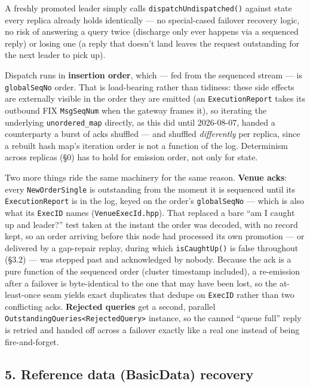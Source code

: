 \documentclass[
  10pt,
]{article}
\begin{document}
A freshly promoted leader simply calls \texttt{dispatchUndispatched()}
against state every replica already holds identically --- no
special-cased failover recovery logic, no risk of answering a query
twice (discharge only ever happens via a sequenced reply) or losing one
(a reply that doesn't land leaves the request outstanding for the next
leader to pick up).

Dispatch runs in \textbf{insertion order}, which --- fed from the
sequenced stream --- is \texttt{globalSeqNo} order. That is load-bearing
rather than tidiness: these side effects are externally visible in the
order they are emitted (an \texttt{ExecutionReport} takes its outbound
FIX \texttt{MsgSeqNum} when the gateway frames it), so iterating the
underlying \texttt{unordered\_map} directly, as this did until
2026-08-07, handed a counterparty a burst of acks shuffled --- and
shuffled \emph{differently} per replica, since a rebuilt hash map's
iteration order is not a function of the log. Determinism across
replicas (§0) has to hold for emission order, not only for state.

Two more things ride the same machinery for the same reason.
\textbf{Venue acks}: every \texttt{NewOrderSingle} is outstanding from
the moment it is sequenced until its \texttt{ExecutionReport} is in the
log, keyed on the order's \texttt{globalSeqNo} --- which is also what
its \texttt{ExecID} names (\texttt{VenueExecId.hpp}). That replaced a
bare ``am I caught up and leader?'' test taken at the instant the order
was decoded, with no record kept, so an order arriving before this node
had processed its own promotion --- or delivered by a gap-repair replay,
during which \texttt{isCaughtUp()} is false throughout (§3.2) --- was
stepped past and acknowledged by nobody. Because the ack is a pure
function of the sequenced order (cluster timestamp included), a
re-emission after a failover is byte-identical to the one that may have
been lost, so the at-least-once seam yields exact duplicates that dedupe
on \texttt{ExecID} rather than two conflicting acks. \textbf{Rejected
queries} get a second, parallel
\texttt{OutstandingQueries\textless{}RejectedQuery\textgreater{}}
instance, so the canned ``queue full'' reply is retried and handed off
across a failover exactly like a real one instead of being
fire-and-forget.

\subsection{5. Reference data (BasicData)
recovery}\label{reference-data-basicdata-recovery}
\end{document}
